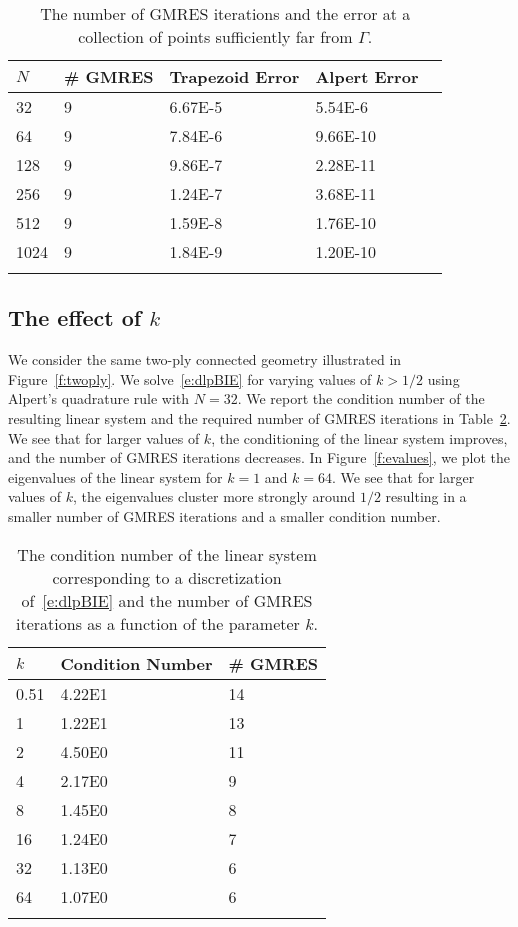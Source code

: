 \begin{table}[htps]
\caption{\label{t:example1} The number of GMRES iterations and the
error at a collection of points sufficiently far from $\Gamma$.}
\centering
\begin{tabular*}{0.8\textwidth}{@{\extracolsep{\fill}}lllll}
$N$ & \# GMRES & Trapezoid Error & Alpert Error  \\
\hline\noalign{\smallskip}
32   & 9 & 6.67E-5 & 5.54E-6  \\
64   & 9 & 7.84E-6 & 9.66E-10 \\
128  & 9 & 9.86E-7 & 2.28E-11 \\
256  & 9 & 1.24E-7 & 3.68E-11 \\
512  & 9 & 1.59E-8 & 1.76E-10 \\  
1024 & 9 & 1.84E-9 & 1.20E-10 \\ 
\noalign{\smallskip}\hline
\end{tabular*}
\end{table}

\subsection{The effect of $k$}
We consider the same two-ply connected geometry illustrated in
Figure~\ref{f:twoply}.  We solve~\eqref{e:dlpBIE} for varying values of
$k > 1/2$ using Alpert's quadrature rule with $N=32$.  We report the
condition number of the resulting linear system and the required number
of GMRES iterations in Table~\ref{t:example2}.  We see that for larger
values of $k$, the conditioning of the linear system improves, and the
number of GMRES iterations decreases.  In Figure~\ref{f:evalues}, we
plot the eigenvalues of the linear system for $k=1$ and $k=64$.  We see
that for larger values of $k$, the eigenvalues cluster more strongly
around $1/2$ resulting in a smaller number of GMRES iterations and a
smaller condition number.

\begin{table}[htps]
\caption{\label{t:example2} The condition number of the linear system
corresponding to a discretization of~\eqref{e:dlpBIE} and the number of
GMRES iterations as a function of the parameter $k$.}
\centering
\begin{tabular*}{0.8\textwidth}{@{\extracolsep{\fill}}lll}
$k$ & Condition Number & \# GMRES \\
\hline\noalign{\smallskip}
0.51 & 4.22E1 & 14 \\
1    & 1.22E1 & 13 \\
2    & 4.50E0 & 11 \\
4    & 2.17E0 & 9  \\
8    & 1.45E0 & 8  \\  
16   & 1.24E0 & 7  \\ 
32   & 1.13E0 & 6  \\
64   & 1.07E0 & 6  \\
\noalign{\smallskip}\hline
\end{tabular*}
\end{table}

